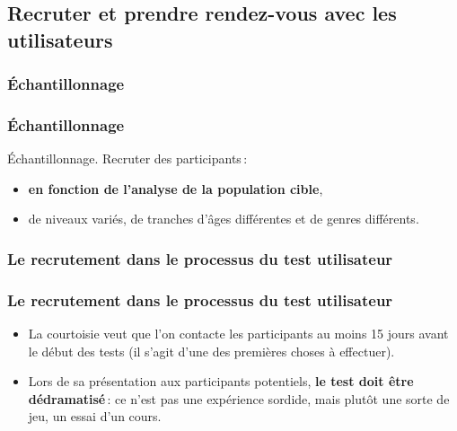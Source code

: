 	\subsection{Recruter et prendre rendez-vous avec les utilisateurs} 
		
			\subsubsection{Échantillonnage} 
			
			\begin{frame}[allowframebreaks]
			\frametitle{Échantillonnage \citep{ergolab2014a}}
			Échantillonnage. Recruter des participants\,:
					\begin {itemize}
					\item \textbf{en fonction de l’analyse de la population cible}, 
					\item de niveaux variés, de tranches d’âges différentes et de genres différents.
					\end{itemize}
			\end{frame} 	
			
			\subsubsection{Le recrutement dans le processus du test utilisateur} 
			
			\begin{frame}[allowframebreaks]
			\frametitle{Le recrutement dans le processus du test utilisateur \citep{ergolab2014a}}
			\begin {itemize}
					\item La courtoisie veut que l’on contacte les participants au moins 15 jours avant le début des tests (il s’agit d’une des premières choses à effectuer).
					\item Lors de sa présentation aux participants potentiels, \textbf{le test doit être dédramatisé}\,: ce n’est pas une expérience sordide, mais plutôt une sorte de jeu, un essai d’un cours.
					\end{itemize}
			\end{frame} 
			
